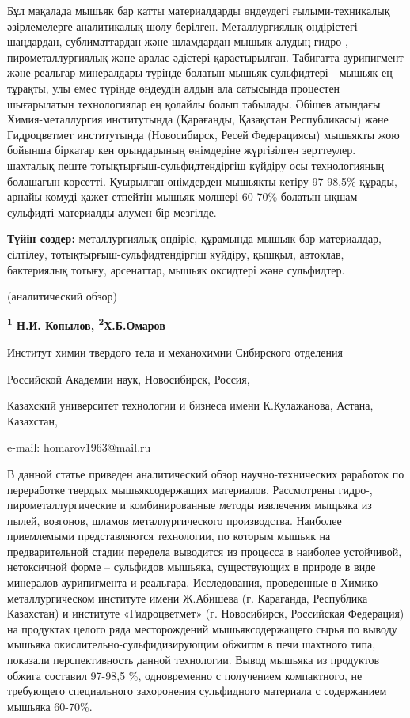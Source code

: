 Бұл мақалада мышьяк бар қатты материалдарды өңдеудегі ғылыми-техникалық
әзірлемелерге аналитикалық шолу берілген. Металлургиялық өндірістегі
шаңдардан, сублиматтардан және шламдардан мышьяк алудың гидро-,
пирометаллургиялық және аралас әдістері қарастырылған. Табиғатта
аурипигмент және реальгар минералдары түрінде болатын мышьяк сульфидтері
- мышьяк ең тұрақты, улы емес түрінде өңдеудің алдын ала сатысында
процестен шығарылатын технологиялар ең қолайлы болып табылады. Әбішев
атындағы Химия-металлургия институтында (Қарағанды, Қазақстан
Республикасы) және Гидроцветмет институтында (Новосибирск, Ресей
Федерациясы) мышьякты жою бойынша бірқатар кен орындарының өнімдеріне
жүргізілген зерттеулер. шахталық пеште тотықтырғыш-сульфидтендіргіш
күйдіру осы технологияның болашағын көрсетті. Қуырылған өнімдерден
мышьякты кетіру 97-98,5\% құрады, арнайы көмуді қажет етпейтін мышьяк
мөлшері 60-70\% болатын ықшам сульфидті материалды алумен бір мезгілде.

{\bfseries Түйін сөздер:} металлургиялық өндіріс, құрамында мышьяк бар
материалдар, сілтілеу, тотықтырғыш-сульфидтендіргіш күйдіру, қышқыл,
автоклав, бактериялық тотығу, арсенаттар, мышьяк оксидтері және
сульфидтер.


\begin{center}
(аналитический обзор)

{\bfseries \textsuperscript{1} Н.И. Копылов,
\textsuperscript{2}Х.Б.Омаров\envelope}

Институт химии твердого тела и механохимии Сибирского отделения

Российской Академии наук, Новосибирск, Россия,

Казахский университет технологии и бизнеса имени К.Кулажанова, Астана,
Казахстан,

e-mail: homarov1963@mail.ru
\end{center}

В данной статье приведен аналитический обзор научно-технических
раработок по переработке твердых мышьяксодержащих материалов.
Рассмотрены гидро-, пирометаллургические и комбинированные методы
извлечения мыщьяка из пылей, возгонов, шламов металлургического
производства. Наиболее приемлемыми представляются технологии, по которым
мышьяк на предварительной стадии передела выводится из процесса в
наиболее устойчивой, нетоксичной форме -- сульфидов мышьяка,
существующих в природе в виде минералов аурипигмента и реальгара.
Исследования, проведенные в Химико-металлургическом институте имени
Ж.Абишева (г. Караганда, Республика Казахстан) и институте
«Гидроцветмет» (г. Новосибирск, Российская Федерация) на продуктах
целого ряда месторождений мышьяксодержащего сырья по выводу мышьяка
окислительно-сульфидизирующим обжигом в печи шахтного типа, показали
перспективность данной технологии. Вывод мышьяка из продуктов обжига
составил 97-98,5 \%, одновременно с получением компактного, не
требующего специального захоронения сульфидного материала с содержанием
мышьяка 60-70\%.

